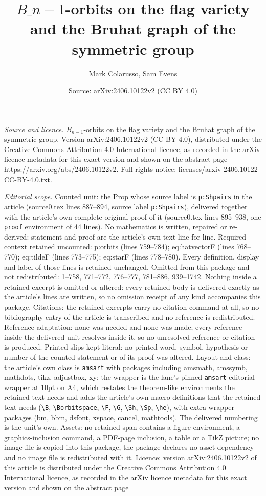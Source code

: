\documentclass[10pt,a4paper]{amsart}
\title[$B\_{n-1}$-orbits on the flag variety and the Bruhat graph of]{$B\_{n-1}$-orbits on the flag variety and the Bruhat graph of the symmetric group}
\author{Mark Colarusso, Sam Evens}
\date{Source: arXiv:2406.10122v2 (CC BY 4.0)}
\begin{document}
\maketitle

\noindent\emph{Source and licence.} $B_{n-1}$-orbits on the flag variety and the Bruhat graph of the symmetric group. Version arXiv:2406.10122v2 (CC BY 4.0), distributed under the Creative Commons Attribution 4.0 International licence, as recorded in the arXiv licence metadata for this exact version and shown on the abstract page https://arxiv.org/abs/2406.10122v2. Full rights notice: licenses/arxiv-2406.10122-CC-BY-4.0.txt.\par\smallskip

\noindent\textit{Editorial scope.} Counted unit: the Prop whose source label is \texttt{p:Shpairs} in the article (source0.tex lines 887--894, source label \texttt{p:Shpairs}), delivered together with the article's own complete original proof of it (source0.tex lines 895--938, one \texttt{proof} environment of 44 lines). No mathematics is written, repaired or re-derived: statement and proof are the article's own text line for line. Required context retained uncounted: p:orbits (lines 759--784); eq:hatvectorF (lines 768--770); eq:tildeF (lines 773--775); eq:starF (lines 778--780). Every definition, display and label of those lines is retained unchanged. Omitted from this package and not redistributed: 1--758, 771--772, 776--777, 781--886, 939--1742. Nothing inside a retained excerpt is omitted or altered: every retained body is delivered exactly as the article's lines are written, so no omission receipt of any kind accompanies this package. Citations: the retained excerpts carry no citation command at all, so no bibliography entry of the article is transcribed and no reference is redistributed. Reference adaptation: none was needed and none was made; every reference inside the delivered unit resolves inside it, so no unresolved reference or citation is produced. Printed slips kept literal: no printed word, symbol, hypothesis or number of the counted statement or of its proof was altered. Layout and class: the article's own class is \texttt{amsart} with packages including amsmath, amssymb, mathdots, tikz, adjustbox, xy; the wrapper is the lane's pinned \texttt{amsart} editorial wrapper at 10pt on A4, which restates the theorem-like environments the retained text needs and adds the article's own macro definitions that the retained text needs (\texttt{\textbackslash B}, \texttt{\textbackslash Borbitspace}, \texttt{\textbackslash F}, \texttt{\textbackslash G}, \texttt{\textbackslash Sh}, \texttt{\textbackslash Sp}, \texttt{\textbackslash he}), with extra wrapper packages (bm, bbm, dsfont, xspace, cancel, mathtools). The delivered numbering is the unit's own. Assets: no retained span contains a figure environment, a graphics-inclusion command, a PDF-page inclusion, a table or a TikZ picture; no image file is copied into this package, the package declares no asset dependency and no image file is redistributed with it. Licence: version arXiv:2406.10122v2 of this article is distributed under the Creative Commons Attribution 4.0 International licence, as recorded in the arXiv licence metadata for this exact version and shown on the abstract page 
\end{document}
